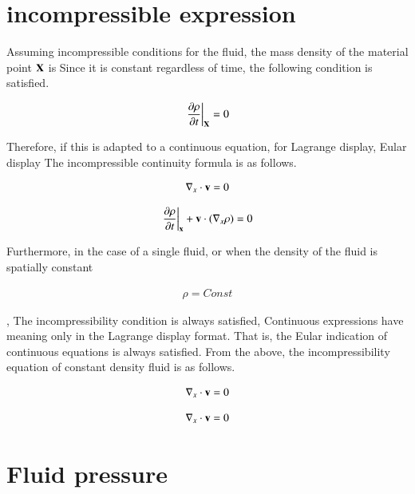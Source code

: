 \section{incompressible expression}
Assuming incompressible conditions for the fluid, the mass density of the material point $\mathbf{X}$ is
Since it is constant regardless of time, the following condition is satisfied.

\begin{eqnarray}
\left.\frac{\partial\rho}{\partial t}\right|_{\mathbf{X}} = 0
\end{eqnarray}

Therefore, if this is adapted to a continuous equation, for Lagrange display, Eular display
The incompressible continuity formula is as follows.

\begin{eqnarray}
\nabla_x \cdot {\mathbf{v}} = 0
\end{eqnarray}

\begin{eqnarray}
\left.\frac{\partial\rho}{\partial t}\right|_{\mathbf{x}}+{\mathbf{v}}\cdot(\nabla_x\rho)=0
\end{eqnarray}

Furthermore, in the case of a single fluid, or when the density of the fluid is spatially constant

\begin{eqnarray}
\rho = Const
\end{eqnarray}

, The incompressibility condition is always satisfied,
Continuous expressions have meaning only in the Lagrange display format.
That is, the Eular indication of continuous equations is always satisfied.
From the above, the incompressibility equation of constant density fluid is as follows.

\begin{eqnarray}
\nabla_x \cdot {\mathbf{v}} = 0
\end{eqnarray}

\begin{tcolorbox}[title=incompressible expression]
\begin{eqnarray}
\nabla_x \cdot {\mathbf{v}} = 0
\end{eqnarray}
\end{tcolorbox}


\section{Fluid pressure}

